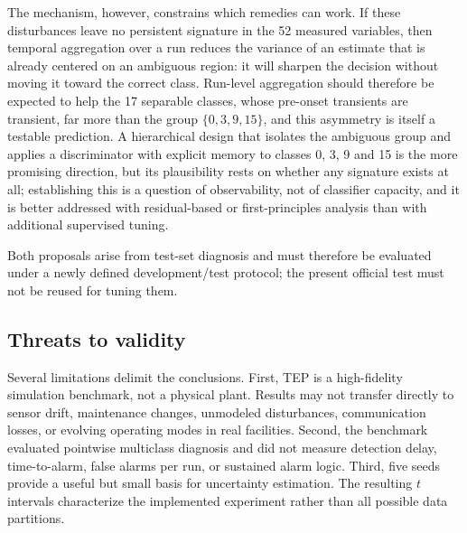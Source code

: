 \documentclass[10pt,twocolumn,a4paper]{article}
\begin{document}
The mechanism, however, constrains which remedies can work. If these
disturbances leave no persistent signature in the 52 measured variables, then
temporal aggregation over a run reduces the variance of an estimate that is
already centered on an ambiguous region: it will sharpen the decision without
moving it toward the correct class. Run-level aggregation should therefore be
expected to help the 17 separable classes, whose pre-onset transients are
transient, far more than the group $\{0,3,9,15\}$, and this asymmetry is itself
a testable prediction. A hierarchical design that isolates the ambiguous group
and applies a discriminator with explicit memory to classes 0, 3, 9 and 15 is
the more promising direction, but its plausibility rests on whether any
signature exists at all; establishing this is a question of observability, not
of classifier capacity, and it is better addressed with residual-based or
first-principles analysis than with additional supervised tuning.

Both proposals arise from test-set diagnosis and must therefore be evaluated
under a newly defined development/test protocol; the present official test must
not be reused for tuning them.

\subsection{Threats to validity}

Several limitations delimit the conclusions. First, TEP is a high-fidelity
simulation benchmark, not a physical plant. Results may not transfer directly
to sensor drift, maintenance changes, unmodeled disturbances, communication
losses, or evolving operating modes in real facilities. Second, the benchmark
evaluated pointwise multiclass diagnosis and did not measure detection delay,
time-to-alarm, false alarms per run, or sustained alarm logic. Third, five seeds
provide a useful but small basis for uncertainty estimation. The resulting
$t$ intervals characterize the implemented experiment rather than all possible
data partitions.
\end{document}
